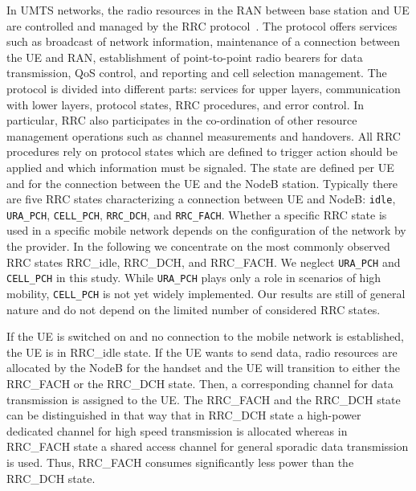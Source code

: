 In UMTS networks, the radio resources in the RAN between base station and UE are controlled and managed by the \gls{RRC} protocol~\cite{3GPP_RRC_Spec}.
The protocol offers services such as broadcast of network information, maintenance of a connection between the \gls{UE} and \gls{RAN}, establishment of point-to-point radio bearers for data transmission, \gls{QoS} control, and reporting and cell selection management.
The protocol is divided into different parts: services for upper layers, communication with lower layers, protocol states, \gls{RRC} procedures, and error control.
In particular, \gls{RRC} also participates in the co-ordination of other resource management operations such as channel measurements and handovers.
All \gls{RRC} procedures rely on protocol states which are defined to trigger action should be applied and which information must be signaled. 
The state are defined per \gls{UE} and for the connection between the \gls{UE} and the \gls{NodeB} station.
Typically there are five \gls{RRC} states characterizing a connection between \gls{UE} and \gls{NodeB}: \texttt{idle}, \texttt{URA\_PCH}, \texttt{CELL\_PCH}, \texttt{RRC\_DCH}, and \texttt{RRC\_FACH}.
Whether a specific \gls{RRC} state is used in a specific mobile network depends on the configuration of the network by the provider.
In the following we concentrate on the most commonly observed~\cite{Qian2010a} \gls{RRC} states \gls{RRC_idle}, \gls{RRC_DCH}, and \gls{RRC_FACH}.
We neglect \texttt{URA\_PCH} and \texttt{CELL\_PCH} in this study.
While \texttt{URA\_PCH} plays only a role in scenarios of high mobility, \texttt{CELL\_PCH} is not yet widely implemented. 
Our results are still of general nature and do not depend on the limited number of considered \gls{RRC} states.

If the \gls{UE} is switched on and no connection to the mobile network is established, the \gls{UE} is in \gls{RRC_idle} state.
If the \gls{UE} wants to send data, radio resources are allocated by the \gls{NodeB} for the handset and the \gls{UE} will transition to either the \gls{RRC_FACH} or the \gls{RRC_DCH} state. 
Then, a corresponding channel for data transmission is assigned to the \gls{UE}.
The \gls{RRC_FACH} and the \gls{RRC_DCH} state can be distinguished in that way that in \gls{RRC_DCH} state a high-power dedicated channel for high speed transmission is allocated whereas in \gls{RRC_FACH} state a shared access channel for general sporadic data transmission is used.
Thus, \gls{RRC_FACH} consumes significantly less power than the \gls{RRC_DCH} state. 

